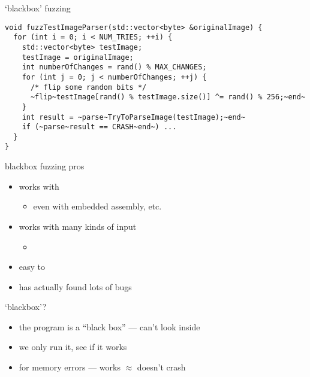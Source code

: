 
\begin{frame}[fragile,label=bbFuzz]{`blackbox' fuzzing}
\begin{lstlisting}
void fuzzTestImageParser(std::vector<byte> &originalImage) {
  for (int i = 0; i < NUM_TRIES; ++i) {
    std::vector<byte> testImage;
    testImage = originalImage;
    int numberOfChanges = rand() % MAX_CHANGES;
    for (int j = 0; j < numberOfChanges; ++j) {
      /* flip some random bits */
      ~flip~testImage[rand() % testImage.size()] ^= rand() % 256;~end~
    }
    int result = ~parse~TryToParseImage(testImage);~end~
    if (~parse~result == CRASH~end~) ...
  }
}
\end{lstlisting}
\end{frame}

\begin{frame}{blackbox fuzzing pros}
    \begin{itemize}
        \item works with 
        \begin{itemize}
            \item even with embedded assembly, etc.
        \end{itemize}
    \item works with many kinds of input
        \begin{itemize}
            \item {}
        \end{itemize}
    \item easy to 
        \vspace{.5cm}
    \item has actually found lots of bugs
    \end{itemize}
\end{frame}

\begin{frame}{`blackbox'?}
    \begin{itemize}
    \item the program is a ``black box'' --- can't look inside
    \item we only run it, see if it works
    \item for memory errors --- works $\approx$ doesn't crash
    \end{itemize}
\end{frame}


